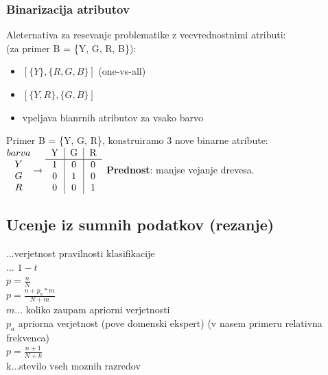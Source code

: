 \subsubsection{Binarizacija atributov}
Aleternativa za resevanje problematike z vecvrednostnimi atributi:\\
 (za primer B = \{Y, G, R, B\}):
\begin{itemize}[leftmargin=*,topsep=0pt,noitemsep]
    \item $\left[\{Y \}, \{R, G, B \} \right]$ (one-vs-all)
    \item $\left[\{Y, R\}, \{G, B\}\right]$ 
    \item vpeljava bianrnih atributov za vsako barvo
\end{itemize}
Primer B = \{Y, G, R\}, konstruiramo 3 nove binarne atribute:\\
$ \begin{matrix} barva \\ Y \\ G \\ R \end{matrix} \rightarrow \begin{tabular}{c|c|c} Y & G & R \\ \hline 1 & 0 & 0 \\ 0 & 1 & 0 \\ 0 & 0 & 1\end{tabular}$
\textbf{Prednost}: manjse vejanje drevesa.


\subsection{Ucenje iz sumnih podatkov (rezanje)}
...verjetnost pravilnosti klasifikacije\\
 $\dots$ $1-t$\\
 $p=\frac{n}{N}$\\
 $p=\frac{n + p_a * m}{N+m}$\\
$m \dots$ koliko zaupam apriorni verjetnosti\\
$p_a$ apriorna verjetnost (pove domenski ekspert) (v nasem primeru relativna frekvenca)\\
 $p=\frac{n+1}{N+k}$\\
k...stevilo vseh moznih razredov

